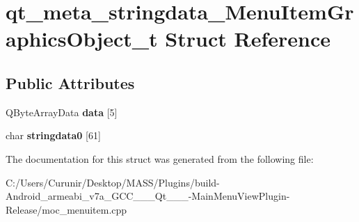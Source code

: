\hypertarget{structqt__meta__stringdata___menu_item_graphics_object__t}{}\section{qt\+\_\+meta\+\_\+stringdata\+\_\+\+Menu\+Item\+Graphics\+Object\+\_\+t Struct Reference}
\label{structqt__meta__stringdata___menu_item_graphics_object__t}
\subsection*{Public Attributes}
\begin{DoxyCompactItemize}
\item 
\mbox{\label{structqt__meta__stringdata___menu_item_graphics_object__t_af9745a02d5975d686fd2629c225f37fc}} 
Q\+Byte\+Array\+Data {\bfseries data} \mbox{[}5\mbox{]}
\item 
\mbox{\label{structqt__meta__stringdata___menu_item_graphics_object__t_a56e432638c023dce510aebff66c320c7}} 
char {\bfseries stringdata0} \mbox{[}61\mbox{]}
\end{DoxyCompactItemize}


The documentation for this struct was generated from the following file\+:\begin{DoxyCompactItemize}
\item 
C\+:/\+Users/\+Curunir/\+Desktop/\+M\+A\+S\+S/\+Plugins/build-\/\+Android\+\_\+armeabi\+\_\+v7a\+\_\+\+G\+C\+C\+\_\+\_\+\_\+\+Qt\+\_\+\_\+\_-\/\+Main\+Menu\+View\+Plugin-\/\+Release/moc\+\_\+menuitem.\+cpp\end{DoxyCompactItemize}
